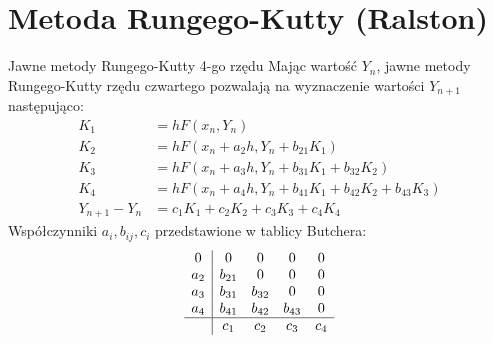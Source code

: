 \documentclass[9pt]{beamer}
\begin{document}
\section{Metoda Rungego-Kutty (Ralston)}
\begin{frame}{Jawne metody Rungego-Kutty 4-go rzędu}
    Mając wartość $Y_n$, jawne metody Rungego-Kutty rzędu czwartego pozwalają na wyznaczenie wartości $Y_{n+1}$ następująco:
    $$ \begin{aligned}
        K_1 &= hF(x_n, Y_n) \\
        K_2 &= hF(x_n + a_2h, Y_n + b_{21}K_1) \\
        K_3 &= hF(x_n + a_3h, Y_n + b_{31}K_1 + b_{32}K_2) \\
        K_4 &= hF(x_n + a_4h, Y_n + b_{41}K_1 + b_{42}K_2 + b_{43}K_3) \\
        Y_{n+1} - Y_n &= c_1K_1 + c_2K_2 + c_3K_3 + c_4K_4
    \end{aligned} $$
    Współczynniki $a_i, b_{ij},c_i$ przedstawione w tablicy Butchera:
    $$\begin{array}{c|cccc}
    0 & 0 & 0 & 0 & 0 \\
    a_2 & b_{21} & 0 & 0 & 0 \\
    a_3 & b_{31} & b_{32} & 0 & 0 \\
    a_4 & b_{41} & b_{42} & b_{43} & 0 \\ \hline
    & c_1 & c_2 & c_3 & c_4
    \end{array}$$
\end{frame}
\end{document}
